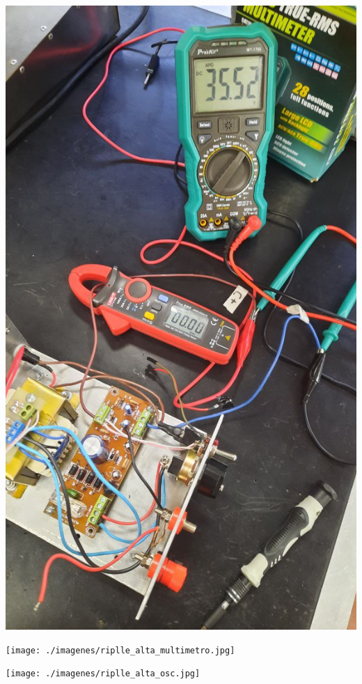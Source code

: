 \begin{center}
    \centering
    \includegraphics[width=0.9\linewidth]{./imagenes/tension_corriente_alta_vacio.jpg}
\end{center}

\saltoPag{}

\begin{center}
    \centering
    \texttt{[image: ./imagenes/riplle\_alta\_multimetro.jpg]}
\end{center}

\begin{center}
    \centering
    \texttt{[image: ./imagenes/riplle\_alta\_osc.jpg]}
\end{center}


\columnbreak{}
\text{}